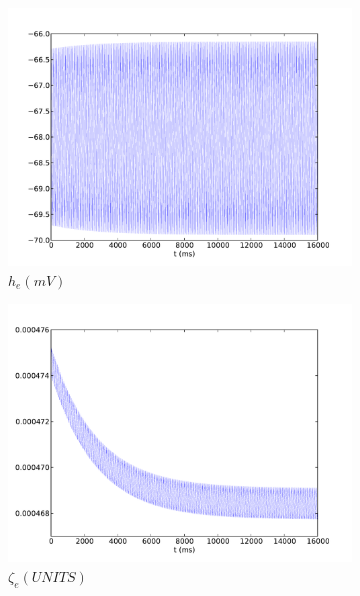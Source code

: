 \documentclass[a4paper,12pt]{article}
\begin{document}
\begin{figure}
	\begin{subfigure}[b]{0.5\textwidth}
		\includegraphics[scale=0.35]{chosen-frontiers-2012/00460-3-he-intra.pdf}
		\caption{$h_e (mV)$}
	\end{subfigure}
	\begin{subfigure}[b]{0.5\textwidth}
		\includegraphics[scale=0.35]{chosen-frontiers-2012/00460-3-slow-intra.pdf}
		\caption{$\zeta_e (UNITS)$}
	\end{subfigure}
	\begin{subfigure}[b]{0.5\textwidth}

\end{subfigure}
\end{figure}
\end{document}
